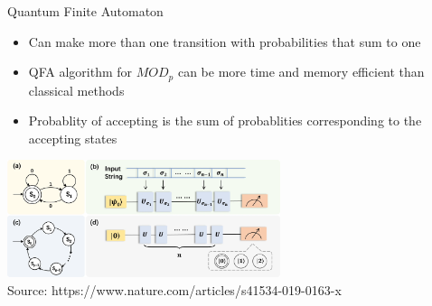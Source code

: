 \documentclass[aspectratio=169,9pt]{beamer}
\begin{document}
\begin{frame}[t]{Quantum Finite Automaton}
  \begin{itemize}
    \item Can make more than one transition with probabilities that sum to one
    \item QFA algorithm for $MOD_p$ can be more time and memory efficient than classical methods
    \item Probablity of accepting is the sum of probablities corresponding to the accepting states
  \end{itemize}
  \includegraphics[width=0.6\textwidth]{DFA.png}\\
  Source: https://www.nature.com/articles/s41534-019-0163-x
\end{frame}


\end{document}
